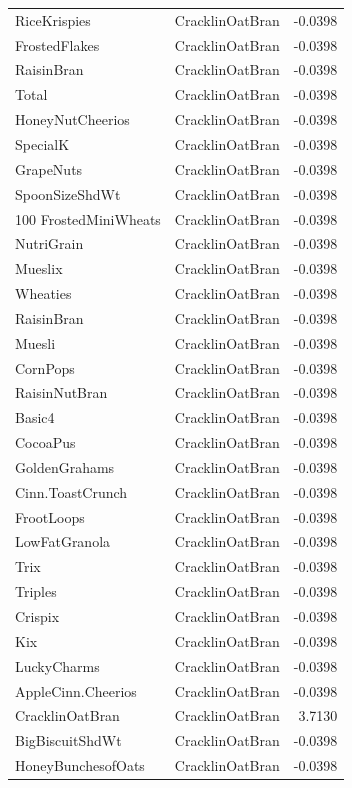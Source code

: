 \begin{longtable}{llr}
RiceKrispies & CracklinOatBran & -0.0398 \\
FrostedFlakes & CracklinOatBran & -0.0398 \\
RaisinBran & CracklinOatBran & -0.0398 \\
Total & CracklinOatBran & -0.0398 \\
HoneyNutCheerios & CracklinOatBran & -0.0398 \\
SpecialK & CracklinOatBran & -0.0398 \\
GrapeNuts & CracklinOatBran & -0.0398 \\
SpoonSizeShdWt & CracklinOatBran & -0.0398 \\
100%
FrostedMiniWheats & CracklinOatBran & -0.0398 \\
NutriGrain & CracklinOatBran & -0.0398 \\
Mueslix & CracklinOatBran & -0.0398 \\
Wheaties & CracklinOatBran & -0.0398 \\
RaisinBran & CracklinOatBran & -0.0398 \\
Muesli & CracklinOatBran & -0.0398 \\
CornPops & CracklinOatBran & -0.0398 \\
RaisinNutBran & CracklinOatBran & -0.0398 \\
Basic4 & CracklinOatBran & -0.0398 \\
CocoaPus & CracklinOatBran & -0.0398 \\
GoldenGrahams & CracklinOatBran & -0.0398 \\
Cinn.ToastCrunch & CracklinOatBran & -0.0398 \\
FrootLoops & CracklinOatBran & -0.0398 \\
LowFatGranola & CracklinOatBran & -0.0398 \\
Trix & CracklinOatBran & -0.0398 \\
Triples & CracklinOatBran & -0.0398 \\
Crispix & CracklinOatBran & -0.0398 \\
Kix & CracklinOatBran & -0.0398 \\
LuckyCharms & CracklinOatBran & -0.0398 \\
AppleCinn.Cheerios & CracklinOatBran & -0.0398 \\
CracklinOatBran & CracklinOatBran & 3.7130 \\
BigBiscuitShdWt & CracklinOatBran & -0.0398 \\
HoneyBunchesofOats & CracklinOatBran & -0.0398 \\

\end{longtable}
